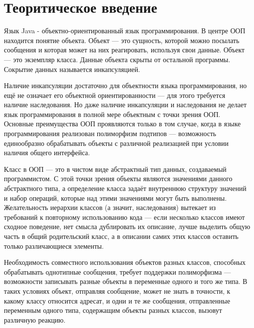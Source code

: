 \documentclass[14pt, a4paper]{extarticle}
\begin{document}
\makeatletter
\renewcommand{\l@section}{\@dottedtocline{1}{0em}{1.25em}}
\renewcommand{\l@subsection}{\@dottedtocline{2}{0em}{1.75em}}
\renewcommand{\l@subsubsection}{\@dottedtocline{3}{0em}{2.6em}}
\renewcommand{\@dotsep}{1.25}
\makeatother

\def\contentsname{СОДЕРЖАНИЕ}

\begin{titlepage}

\end{titlepage}

\section*{Теоритическое введение}
Язык Java - объектно-ориентированный язык программирования.
В центре ООП находится понятие объекта. Объект — это сущность,
которой можно посылать сообщения и которая может на них
реагировать, используя свои данные. Объект — это экземпляр класса.
Данные объекта скрыты от остальной программы. Сокрытие данных
называется инкапсуляцией.

Наличие инкапсуляции достаточно для объектности языка
программирования, но ещё не означает его объектной
ориентированности — для этого требуется наличие наследования.
Но даже наличие инкапсуляции и наследования не делает язык
программирования в полной мере объектным с точки зрения ООП.
Основные преимущества ООП проявляются только в том случае, когда
в языке программирования реализован полиморфизм подтипов —
возможность единообразно обрабатывать объекты с различной
реализацией при условии наличия общего интерфейса.

Класс в ООП — это в чистом виде абстрактный тип данных,
создаваемый программистом. С этой точки зрения объекты являются
значениями данного абстрактного типа, а определение класса задаёт
внутреннюю структуру значений и набор операций, которые над этими
значениями могут быть выполнены. Желательность иерархии классов
(а значит, наследования) вытекает из требований к повторному
использованию кода — если несколько классов имеют сходное
поведение, нет смысла дублировать их описание, лучше выделить
общую часть в общий родительский класс, а в описании самих этих
классов оставить только различающиеся элементы.

Необходимость совместного использования объектов разных
классов, способных обрабатывать однотипные сообщения, требует 
поддержки полиморфизма — возможности записывать разные
объекты в переменные одного и того же типа. В таких условиях объект,
отправляя сообщение, может не знать в точности, к какому классу
относится адресат, и одни и те же сообщения, отправленные
переменным одного типа, содержащим объекты разных классов,
вызовут различную реакцию.
\end{document}
